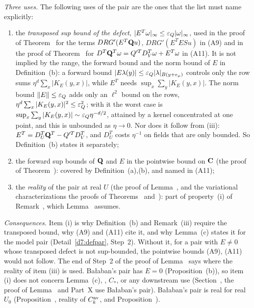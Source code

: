 \begin{detail}
\begin{step}
\emph{Three uses.} The following uses of the pair are the ones that the list must name explicitly:
\begin{enumerate}[label=(\roman*)]
\item the \emph{transposed sup bound of the defect}, $|E^T\omega|_\infty\le\varepsilon_Q|\omega|_\infty$, used in the proof of Theorem~ for the terms $DRG'(E^T\mathbf Q u)$, $DRG'(E^TESu)$ in (A9) and in the proof of Theorem~ for $D^T\mathbf Q^T\omega=Q'^TD_V^T\omega+E^T\omega$ in (A11). It is not implied by the range, the forward bound and the norm bound of $E$ in Definition~(b): a forward bound $|E\lambda(y)|\le\varepsilon_Q|\lambda|_{B(y+e_\mu)}$ controls only the row sums $\eta^d\sum_x|K_E(y,x)|$, while $E^T$ needs $\sup_x\sum_y|K_E(y,x)|$. The norm bound $\|E\|\le\varepsilon_Q$ adds only an $\ell^2$ bound on the rows, $\eta^d\sum_x|K_E(y,x)|^2\le\varepsilon_Q^2$; with it the worst case is $\sup_x\sum_y|K_E(y,x)|\sim\varepsilon_Q\eta^{-d/2}$, attained by a kernel concentrated at one point, and this is unbounded as $\eta\to0$. Nor does it follow from (iii): $E^T=D_U^T\mathbf Q^T-Q'^TD_V^T$, and $D_U^T$ costs $\eta^{-1}$ on fields that are only bounded. So Definition~(b) states it separately;
\item the forward sup bounds of $\mathbf Q$ and $E$ in the pointwise bound on $\mathbf C$ (the proof of Theorem~): covered by Definition~(a),(b), and named in (A11);
\item the \emph{reality} of the pair at real $U$ (the proof of Lemma~, and the variational characterizations the proofs of Theorems~ and~): part of property~(i) of Remark~, which Lemma~ assumes.
\end{enumerate}
\end{step}
\begin{step}
\emph{Consequences.} Item (i) is why Definition~(b) and Remark~(iii) require the transposed bound, why (A9) and (A11) cite it, and why Lemma~(c) states it for the model pair (Detail~\ref{d7:defpar}, Step~2). Without it, for a pair with $E\ne0$ whose transposed defect is not sup-bounded, the pointwise bounds (A9), (A11) would not follow. The end of Step~2 of the proof of Lemma~ says where the reality of item (iii) is used. Ba\l aban's pair has $E=0$ (Proposition~(b)), so item (i) does not concern Lemma~(c), , $C_*$, or any downstream use (Section~, the proof of Lemma~ and Part~X use Ba\l aban's pair). Ba\l aban's pair is real for real $U_0$ (Proposition~, reality of $C^{\rm av}_k$, and Proposition~).
\end{step}
\end{detail}

